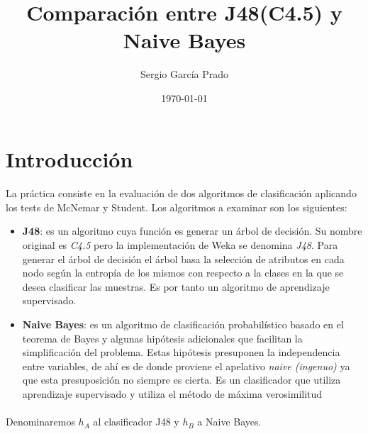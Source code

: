 \documentclass[10pt, a4paper,spanish]{article}
\title{\vspace{-15mm}\fontsize{24pt}{10pt}\selectfont\textbf{Comparación entre J48(C4.5) y Naive Bayes}} %
\author{Sergio García Prado}
\date{\today}
\begin{document}
	\maketitle %

	\thispagestyle{fancy} %


	\section{Introducción}
        \paragraph{}
		La práctica consiste en la evaluación de dos algoritmos de clasificación aplicando los tests de McNemar y Student. Los algoritmos a examinar son los siguientes:

		\begin{itemize}

			\item \textbf{J48}: es un algoritmo cuya función es generar un árbol de decisión. Su nombre original es \emph{C4.5} pero la implementación de Weka se denomina \emph{J48}. Para generar el árbol de decisión el árbol basa la selección de atributos en cada nodo según la entropía de los mismos con respecto a la clases en la que se desea clasificar las muestras. Es por tanto un algoritmo de aprendizaje supervisado.

			\item \textbf{Naive Bayes}: es un algoritmo de clasificación probabilístico basado en el teorema de Bayes y algunas hipótesis adicionales que facilitan la simplificación del problema. Estas hipótesis presuponen la independencia entre variables, de ahí es de donde proviene el apelativo \emph{naive (ingenuo)} ya que esta presuposición no siempre es cierta. Es un clasificador que utiliza aprendizaje supervisado y utiliza el método de máxima verosimilitud

		\end{itemize}

		\paragraph{}
		Denominaremos $h_A$ al clasificador J48 y $h_B$ a Naive Bayes.
\end{document}
